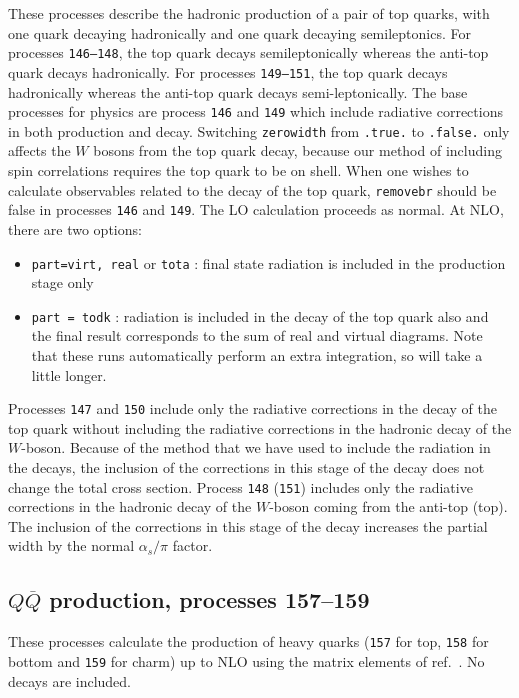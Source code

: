 \documentclass[12pt]{article}
\begin{document}
These processes describe the hadronic production of a pair of top
quarks, with one quark decaying hadronically and one quark decaying
semileptonics.  For processes {\tt 146--148}, the top quark decays
semileptonically whereas the anti-top quark decays hadronically.  For
processes {\tt 149--151}, the top quark decays hadronically whereas the
anti-top quark decays semi-leptonically.  The base processes for
physics are process {\tt 146} and {\tt 149} which include
radiative corrections in both production and decay.  Switching {\tt zerowidth} from 
{\tt .true.} to {\tt .false.} only affects the $W$ bosons from the top
quark decay, because our method of including spin correlations
requires the top quark to be on shell.
When one wishes to calculate observables related to the decay of the top
quark, {\tt removebr} should be false in processes {\tt 146} and {\tt 149}.
The LO calculation proceeds as normal. At NLO, there are two options:
\begin{itemize}
\item {\tt part=virt, real} or {\tt tota} : final state radiation is included
in the production stage only
\item {\tt part = todk} : radiation is included in the decay of the top
quark also and the final result corresponds to the sum of real and virtual
diagrams. 
Note that these runs automatically perform an extra integration, so
will take a little longer.
\end{itemize}


Processes {\tt 147} and {\tt 150} include only the radiative 
corrections in the decay of the top quark without including 
the radiative corrections in the hadronic decay of the $W$-boson.
Because of the method that we have used to include the radiation in the decays,
the inclusion of the corrections in this stage of the decay does not change the
total cross section.
Process {\tt 148} ({\tt 151}) includes only the radiative corrections
in the hadronic decay of the $W$-boson coming from the anti-top (top).
The inclusion of the corrections in this stage of the decay increases the
partial width by the normal $\alpha_s/\pi$ factor.

\subsection{$Q\overline{Q}$ production, processes 157--159}
These processes calculate the production of heavy quarks
({\tt 157} for top, {\tt 158} for bottom and {\tt 159} for charm) up to NLO 
using the matrix elements of ref.~\cite{Nason:1987xz}. No decays
are included.
\end{document}
